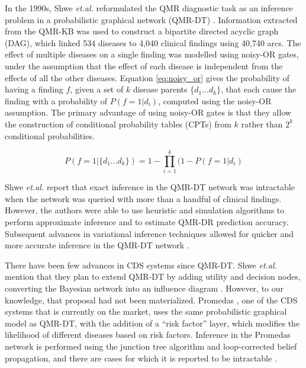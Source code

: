 \documentclass[11pt]{article}
\begin{document}
In the 1990s, Shwe \textit{et.al.} reformulated the QMR diagnostic task as an inference problem in a probabilistic graphical network (QMR-DT) \cite{Shwe1991,Middleton1991}. Information extracted from the QMR-KB was used to construct a bipartite directed acyclic graph (DAG), which linked 534 diseases to 4,040 clinical findings using 40,740 arcs. The effect of multiple diseases on a single finding was modelled using noisy-OR gates, under the assumption that the effect of each disease is independent from the effects of all the other diseases. Equation \ref{eq:noisy_or} gives the probability of having a finding $f$, given a set of $k$ disease parents $\{d_1...d_k\}$, that each cause the finding with a probability of $P(f=1|d_i)$, computed using the noisy-OR assumption. The primary advantage of using noisy-OR gates is that they allow the construction of conditional probability tables (CPTs) from $k$ rather than $2^k$ conditional probabilities. 

\begin{equation} \label{eq:noisy_or}
P(f = 1 | \{d_1...d_k\}) = 1 - \prod_{i=1}^{k} (1 - P(f = 1 | d_{i})
\end{equation}

Shwe \textit{et.al.} report that exact inference in the QMR-DT network was intractable when the network was queried with more than a handful of clinical findings. However, the authors were able to use heuristic and simulation algorithms to perform approximate inference and to estimate QMR-DR prediction accuracy. Subsequent advances in variational inference techniques allowed for quicker and more accurate inference in the QMR-DT network \cite{Heckerman1989,Jaakkola1999,Ng1999,Kappen2001,Heskes2002}. 

There have been few advances in CDS systems since QMR-DT. Shwe \textit{et.al.} mention that they plan to extend QMR-DT by adding utility and decision nodes, converting the Bayesian network into an influence diagram \cite{Shwe1991}. However, to our knowledge, that proposal had not been materialized. Promedas \cite{Wemmenhove2007}, one of the CDS systems that is currently on the market, uses the same probabilistic graphical model as QMR-DT, with the addition of a ``risk factor'' layer, which modifies the likelihood of different diseases based on risk factors. Inference in the Promedas network is performed using the junction tree algorithm and loop-corrected belief propagation, and there are cases for which it is reported to be intractable \cite{Wemmenhove2007}.
\end{document}
